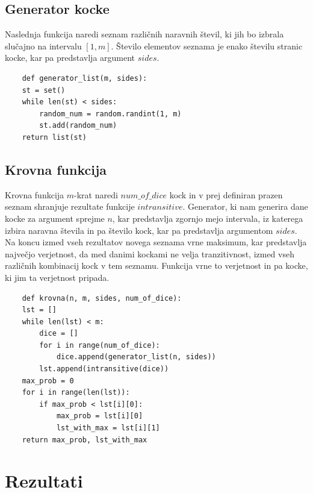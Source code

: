 \documentclass[12pt,a4paper]{amsart}
\begin{document}
 \subsection{Generator kocke}
 Naslednja funkcija naredi seznam različnih naravnih števil, ki jih bo izbrala slučajno na intervalu $\left[1,m\right]$. 
 Število elementov seznama je enako številu stranic kocke, kar pa predstavlja argument $sides$.
 \begin{verbatim}
    def generator_list(m, sides):
    st = set()
    while len(st) < sides:
        random_num = random.randint(1, m)
        st.add(random_num)
    return list(st)
 \end{verbatim}

 \subsection{Krovna funkcija}
 Krovna funkcija $m$-krat naredi $num\_of\_dice$ kock in v prej definiran prazen seznam shranjuje rezultate funkcije $intransitive$. 
 Generator, ki nam generira dane kocke za argument sprejme $n$, kar predstavlja zgornjo mejo intervala, iz katerega izbira naravna števila in pa število kock, kar pa predstavlja argumentom $sides$.
 Na koncu izmed vseh rezultatov novega seznama vrne maksimum, kar predstavlja največjo verjetnost, da med danimi kockami ne velja tranzitivnost, izmed vseh različnih kombinacij kock v tem seznamu.
 Funkcija vrne to verjetnost in pa kocke, ki jim ta verjetnost pripada.
 \begin{verbatim}
    def krovna(n, m, sides, num_of_dice):  
    lst = []
    while len(lst) < m: 
        dice = []
        for i in range(num_of_dice):
            dice.append(generator_list(n, sides))
        lst.append(intransitive(dice))
    max_prob = 0
    for i in range(len(lst)):
        if max_prob < lst[i][0]:
            max_prob = lst[i][0]
            lst_with_max = lst[i][1]
    return max_prob, lst_with_max
 \end{verbatim}

 \section{Rezultati}
\end{document}
